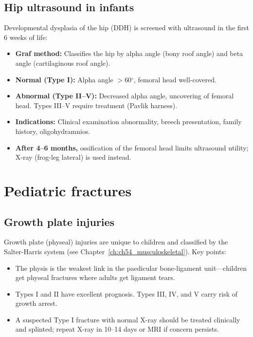 \subsection{Hip ultrasound in infants}
Developmental dysplasia of the hip (DDH) is screened with ultrasound in the first 6 weeks of life:
\begin{itemize}
    \item \textbf{Graf method:} Classifies the hip by alpha angle (bony roof angle) and beta angle (cartilaginous roof angle).
    \item \textbf{Normal (Type I):} Alpha angle $>$60$^\circ$, femoral head well-covered.
    \item \textbf{Abnormal (Type II--V):} Decreased alpha angle, uncovering of femoral head. Types III--V require treatment (Pavlik harness).
    \item \textbf{Indications:} Clinical examination abnormality, breech presentation, family history, oligohydramnios.
    \item \textbf{After 4--6 months,} ossification of the femoral head limits ultrasound utility; X-ray (frog-leg lateral) is used instead.
\end{itemize}

\section{Pediatric fractures}

\subsection{Growth plate injuries}
Growth plate (physeal) injuries are unique to children and classified by the Salter-Harris system (see Chapter~\ref{ch:ch54_musculoskeletal}). Key points:
\begin{itemize}
    \item The physis is the weakest link in the paedicular bone-ligament unit---children get physeal fractures where adults get ligament tears.
    \item Types I and II have excellent prognosis. Types III, IV, and V carry risk of growth arrest.
    \item A suspected Type I fracture with normal X-ray should be treated clinically and splinted; repeat X-ray in 10--14 days or MRI if concern persists.
\end{itemize}

